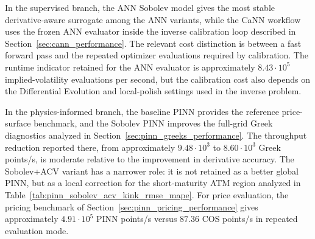 \begin{table}[H]
    \centering
    \caption{RMSE summary for the final models.}
    \label{tab:pinn_global_rmse_mape}
    \small
    \setlength{\tabcolsep}{4pt}
\end{table}

In the supervised branch, the ANN Sobolev model gives the most stable derivative-aware surrogate among the ANN variants, while the CaNN workflow uses the frozen ANN evaluator inside the inverse calibration loop described in Section~\ref{sec:cann_performance}. The relevant cost distinction is between a fast forward pass and the repeated optimizer evaluations required by calibration. The runtime indicator retained for the ANN evaluator is approximately \(8.43\cdot10^5\) implied-volatility evaluations per second, but the calibration cost also depends on the Differential Evolution and local-polish settings used in the inverse problem.

In the physics-informed branch, the baseline PINN provides the reference price-surface benchmark, and the Sobolev PINN improves the full-grid Greek diagnostics analyzed in Section~\ref{sec:pinn_greeks_performance}. 
The throughput reduction reported there, from approximately \(9.48\cdot10^3\) to \(8.60\cdot10^3\) Greek points/s, is moderate relative to the improvement in derivative accuracy. 
The Sobolev+ACV variant has a narrower role: it is not retained as a better global PINN, but as a local correction for the short-maturity ATM region analyzed in Table~\ref{tab:pinn_sobolev_acv_kink_rmse_mape}. 
For price evaluation, the pricing benchmark of Section~\ref{sec:pinn_pricing_performance} gives approximately \(4.91\cdot10^5\) PINN points/s versus \(87.36\) COS points/s in repeated evaluation mode. 
